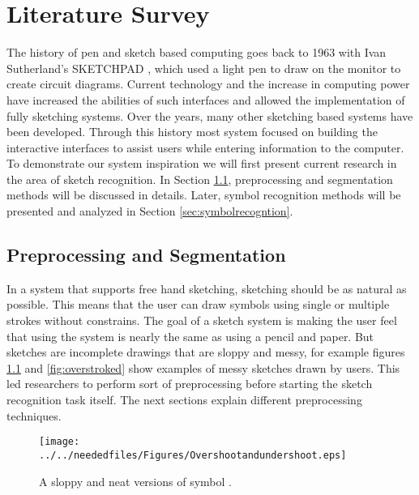 \chapter{Literature Survey}
\label{sec:survey}
The history of pen and sketch based computing goes back to 1963 with Ivan Sutherland's SKETCHPAD \cite{sutherlandsketch}, which used a light pen to draw on the monitor to create circuit diagrams. Current technology and the increase in computing power have increased the abilities of such interfaces and allowed the implementation of fully sketching systems. Over the years, many other sketching based systems have been developed. Through this history most system focused on building the interactive interfaces to assist users while entering information to the computer. To demonstrate our system inspiration we will first present current research in the area of sketch recognition. In Section \ref{sec:preprocessingSeg}, preprocessing and segmentation methods will be discussed in details. Later, symbol recognition methods will be presented and analyzed in Section \ref{sec:symbolrecogntion}. 


\section{Preprocessing and Segmentation}
\label{sec:preprocessingSeg}
  In a system that supports free hand sketching, sketching should be as natural as possible. This means that the user can draw symbols using single or multiple strokes without constrains. The goal of a sketch system is making the user feel that using the system is nearly the same as using a pencil and paper. But sketches are incomplete drawings that are sloppy and messy, for example figures \ref{fig:Overshootandundershoot} and \ref{fig:overstroked} show examples of messy sketches drawn by users. This led researchers to perform sort of preprocessing before starting the sketch recognition task itself. The next sections explain different preprocessing techniques. 
   
\begin{figure}
	\centering
		\texttt{[image: ../../neededfiles/Figures/Overshootandundershoot.eps]}
	\caption[Neat and Sloppy Symbols] {A sloppy and neat versions of symbol \cite{threeproblmes23}.}
	\label{fig:Overshootandundershoot}
\end{figure}

